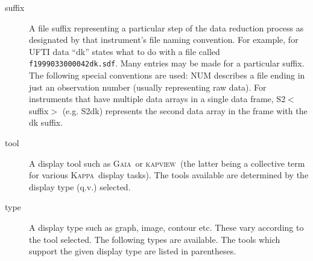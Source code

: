 \documentclass[twoside,11pt]{article}
\newcommand{\xref}[3]{#1}
\renewcommand{\_}{\texttt{\symbol{95}}}
\newcommand{\Kappa}{\xref{{\textsc{Kappa}}}{sun95}{}}
\newcommand{\kapview}{\textsc{kapview}}
\newcommand{\gaia}{\xref{{\textsc{Gaia}}}{sun214}{}}
\begin{document}
\begin{description}
\item[suffix] \mbox{}

A file suffix representing a particular step of the data reduction
process as designated by that instrument's file naming convention. For
example, for UFTI data ``dk'' states what to do with a file called
 \texttt{f19990330\_00042\_dk.sdf}. Many entries may be made for a particular
suffix. The following special conventions are used: NUM describes a
file ending in just an observation number (usually representing raw
data). For instruments that have multiple data arrays in a single data
frame, S2$<$suffix$>$ (e.g. S2dk) represents the second data array in the
frame with the \_dk suffix.

\item[tool] \mbox{}

A display tool such as \gaia\ or \kapview\ (the latter being a collective
term for various \Kappa\ display tasks). The tools available are
determined by the display type (q.v.) selected.

\item[type] \mbox{}

A display type such as graph, image, contour etc.  These vary according 
to the tool selected.   The following types are available.  The tools
which support the given display type are listed in parentheses.

\end{description}
\end{document}
